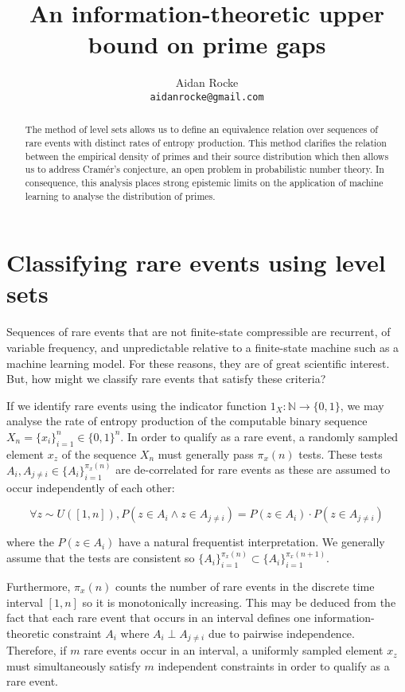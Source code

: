 \documentclass{article}
\title{An information-theoretic upper bound on prime gaps}
\author{%
  Aidan Rocke\\
  \texttt{aidanrocke@gmail.com} \\
}
\begin{document}
\maketitle

\begin{abstract}
The method of level sets allows us to define an equivalence relation over sequences of rare events with distinct rates of entropy production. This method clarifies the relation between the empirical density of primes and their source distribution which then allows us to address Cramér's conjecture, an open problem in probabilistic number theory. In consequence, this analysis places strong epistemic limits on the
application of machine learning to analyse the distribution of primes.
\end{abstract}

\section{Classifying rare events using level sets}
 
Sequences of rare events that are not finite-state compressible are recurrent, of variable frequency, and unpredictable relative to a finite-state machine such as a machine learning model. For these reasons, they are of great scientific interest. But, how might we classify rare events that satisfy these criteria? 

If we identify rare events using the indicator function $1_X: \mathbb{N} \rightarrow \{0,1\}$, we may analyse the rate of
entropy production of the computable binary sequence $X_n = \{x_i\}_{i=1}^n \in \{0,1\}^n$. In order to qualify as a rare event, a randomly sampled element $x_z$ of the sequence $X_n$ must generally
pass $\pi_x(n)$ tests. These tests $A_i, A_{j \neq i} \in \{A_i\}_{i=1}^{\pi_x(n)}$ are de-correlated for rare events as these are assumed to occur independently of each other: 

\begin{equation}
\forall z \sim U([1,n]), P(z \in A_i \land z \in A_{j \neq i}) = P(z \in A_i ) \cdot P(z \in A_{j \neq i})
\end{equation}

where the $P(z \in A_i )$ have a natural frequentist interpretation. We generally assume that the tests are consistent so $\{A_i\}_{i=1}^{\pi_x(n)} \subset \{A_i\}_{i=1}^{\pi_x(n+1)}$. 

Furthermore, $\pi_{x}(n)$ counts the number of rare events in the discrete time interval $[1,n]$ so it is monotonically increasing. This may be deduced from the fact that each rare event that occurs in an interval defines one information-theoretic constraint $A_i$ where $A_i \perp A_{j \neq i}$ due to pairwise independence. Therefore, if $m$ rare events occur in an interval, a uniformly sampled element $x_z$ must simultaneously satisfy $m$ independent constraints in order to qualify as a rare event.
\end{document}
